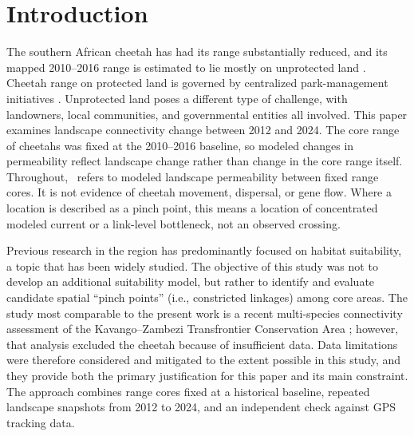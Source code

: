 \section{Introduction}
\label{sec:intro}

The southern African cheetah has had its range substantially reduced, and its mapped 2010--2016 range is estimated to lie mostly on unprotected land \parencite{weise2017distribution}. Cheetah range on protected land is governed by centralized park-management initiatives \parencite{buk2018metapopulation}. Unprotected land poses a different type of challenge, with landowners, local communities, and governmental entities all involved. This paper examines landscape connectivity change between 2012 and 2024. The core range of cheetahs was fixed at the 2010--2016 baseline, so modeled changes in permeability reflect landscape change rather than change in the core range itself. Throughout, \structconn\ refers to modeled landscape permeability between fixed range cores. It is not evidence of cheetah movement, dispersal, or gene flow. Where a location is described as a pinch point, this means a location of concentrated modeled current or a link-level bottleneck, not an observed crossing.

Previous research in the region has predominantly focused on habitat suitability, a topic that has been widely studied. The objective of this study was not to develop an additional suitability model, but rather to identify and evaluate candidate spatial ``pinch points'' (i.e., constricted linkages) among core areas. The study most comparable to the present work is a recent multi-species connectivity assessment of the Kavango--Zambezi Transfrontier Conservation Area \parencite{sousa2026kaza}; however, that analysis excluded the cheetah because of insufficient data. Data limitations were therefore considered and mitigated to the extent possible in this study, and they provide both the primary justification for this paper and its main constraint. The approach combines range cores fixed at a historical baseline, repeated landscape snapshots from 2012 to 2024, and an independent check against GPS tracking data.

